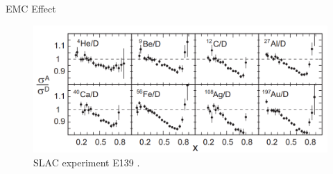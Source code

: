\documentclass{beamer}
\begin{document}

\begin{frame}{EMC Effect}

\begin{figure}
	\caption*{\label{EMC_slac} SLAC experiment E139 \cite{slac_emc} .}
	\includegraphics[width =12cm]{../images/EMC_slac_horiz.png}
\end{figure}


\end{frame}
\end{document}
